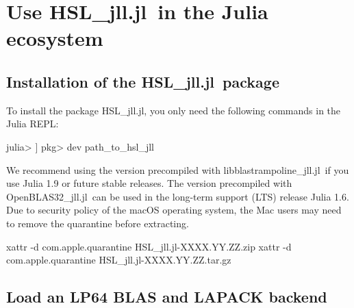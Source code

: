 \documentclass[gdweb]{geradwp}
\newcommand{\HSLjll}{HSL\_jll.jl}
\newcommand{\LBTjll}{libblastrampoline\_jll.jl}
\newcommand{\OpenBLASjll}{OpenBLAS32\_jll.jl}
\begin{document}
\section{Use \HSLjll~in the Julia ecosystem}

\subsection{Installation of the \HSLjll~package}

To install the package \HSLjll, you only need the following commands in the Julia REPL:
\begin{jllisting}
julia> ]
pkg> dev path_to_hsl_jll
\end{jllisting}
We recommend using the version precompiled with \LBTjll~if you use Julia 1.9 or future stable releases.
The version precompiled with \OpenBLASjll~can be used in the long-term support (LTS) release Julia 1.6.
Due to security policy of the macOS operating system, the Mac users may need to remove the quarantine before extracting.
\begin{jllisting}
xattr -d com.apple.quarantine HSL_jll.jl-XXXX.YY.ZZ.zip
xattr -d com.apple.quarantine HSL_jll.jl-XXXX.YY.ZZ.tar.gz
\end{jllisting}

\subsection{Load an LP64 BLAS and LAPACK backend}
\end{document}
